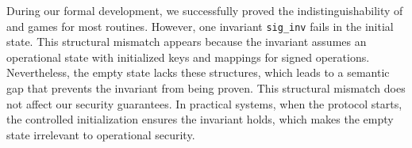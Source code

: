 During our formal development, we successfully proved the 
indistinguishability of \real and \ideal games for most routines. 
%
However, one invariant \texttt{sig\_inv} fails in the initial state. 
%
This structural mismatch appears because the invariant assumes an operational 
state with initialized keys and mappings for signed operations. 
%
Nevertheless, the empty state lacks these structures, which leads to a 
semantic gap that prevents the invariant from being proven. 
%
This structural mismatch does not affect our security guarantees.
%
In practical systems, when the protocol starts, the controlled initialization ensures the invariant holds, 
which makes the empty state irrelevant to operational security. 
%
%



%




